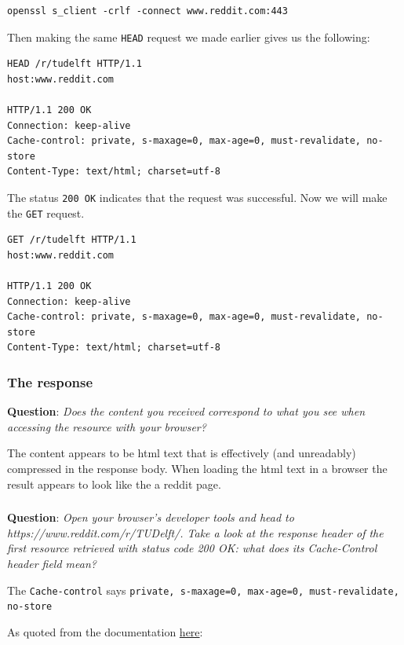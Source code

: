 \documentclass{article}
\begin{document}
\begin{lstlisting}
openssl s_client -crlf -connect www.reddit.com:443
\end{lstlisting}

Then making the same \texttt{HEAD} request we made earlier gives us the following:

\begin{lstlisting}
HEAD /r/tudelft HTTP/1.1
host:www.reddit.com

HTTP/1.1 200 OK
Connection: keep-alive
Cache-control: private, s-maxage=0, max-age=0, must-revalidate, no-store
Content-Type: text/html; charset=utf-8
\end{lstlisting}

The status \texttt{200 OK} indicates that the request was successful. Now we will make the \texttt{GET} request.

\begin{lstlisting}
GET /r/tudelft HTTP/1.1
host:www.reddit.com

HTTP/1.1 200 OK
Connection: keep-alive
Cache-control: private, s-maxage=0, max-age=0, must-revalidate, no-store
Content-Type: text/html; charset=utf-8
\end{lstlisting}

\subsubsection{The response}
\textbf{Question}: \textit{Does the content you received correspond to what you see when accessing the resource with your browser?}

The content appears to be html text that is effectively (and unreadably) compressed in the response body. When loading the html text in a browser the result appears to look like the a reddit page.

\subsubsection {}
\textbf{Question}: \textit{Open your browser’s developer tools and head to https://www.reddit.com/r/TUDelft/. Take a look at the response header of the first resource retrieved with status code 200 OK: what does its Cache-Control header field mean?}

The \texttt{Cache-control} says \texttt{private, s-maxage=0, max-age=0, must-revalidate, no-store}

As quoted from the documentation \href{https://developer.mozilla.org/en-US/docs/Web/HTTP/Headers/Cache-Control}{here}:
\end{document}
